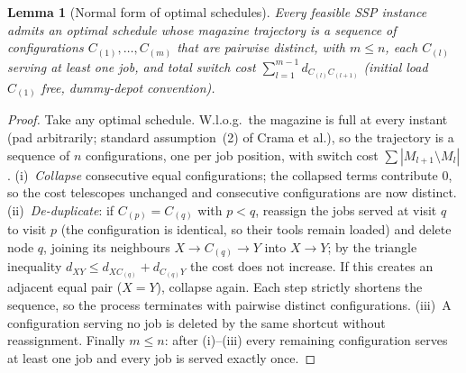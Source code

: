 \documentclass[11pt,a4paper]{article}
\theoremstyle{plain}
\newtheorem{lemma}[theorem]{Lemma}
\theoremstyle{definition}
\begin{document}
\begin{thmbox}
	\begin{lemma}[Normal form of optimal schedules]
		\label{lem:normalform}
		Every feasible SSP instance admits an optimal schedule whose magazine trajectory is a
		sequence of configurations $C_{(1)},\dots,C_{(m)}$ that are \emph{pairwise distinct},
		with $m\le n$, each $C_{(l)}$ serving at least one job, and total switch cost
		$\sum_{l=1}^{m-1} d_{C_{(l)}C_{(l+1)}}$ (initial load $C_{(1)}$ free, dummy-depot
		convention).
	\end{lemma}
\end{thmbox}
\begin{proofbox}
	\begin{proof}
		Take any optimal schedule. W.l.o.g.\ the magazine is full at every instant (pad
		arbitrarily; standard assumption~(2) of Crama et al.), so the trajectory is a sequence
		of $n$ configurations, one per job position, with switch cost
		$\sum|M_{l+1}\setminus M_l|$. (i)~\emph{Collapse} consecutive equal configurations;
		the collapsed terms contribute $0$, so the cost telescopes unchanged and consecutive
		configurations are now distinct. (ii)~\emph{De-duplicate}: if $C_{(p)}=C_{(q)}$ with
		$p<q$, reassign the jobs served at visit $q$ to visit $p$ (the configuration is
		identical, so their tools remain loaded) and delete node $q$, joining its neighbours
		$X\to C_{(q)}\to Y$ into $X\to Y$; by the triangle inequality
		$d_{XY}\le d_{XC_{(q)}}+d_{C_{(q)}Y}$ the cost does not increase. If this creates an
		adjacent equal pair ($X=Y$), collapse again. Each step strictly shortens the sequence,
		so the process terminates with pairwise distinct configurations. (iii)~A configuration
		serving no job is deleted by the same shortcut without reassignment. Finally $m\le n$:
		after (i)--(iii) every remaining configuration serves at least one job and every job is
		served exactly once.
	\end{proof}
\end{proofbox}
\end{document}
